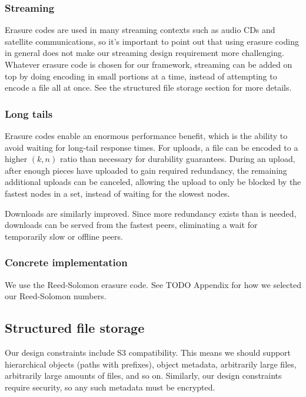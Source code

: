 \documentclass[a4paper,10pt]{article}
\newcommand{\todo}[1]{{\color{red} TODO #1}}
\begin{document}
\subsubsection{Streaming}

Erasure codes are used in many streaming contexts such as audio CDs and
satellite communications, so it's important to point out that using
erasure coding in general does not make our streaming design requirement
more challenging. Whatever erasure code is chosen for our framework, streaming
can be added on top by doing encoding in small portions at a time, instead of
attempting to encode a file all at once. See the structured file storage
section for more details.

\subsubsection{Long tails}

Erasure codes enable an enormous performance benefit, which is the ability
to avoid waiting for long-tail response times.\cite{tail-at-scale} For uploads,
a file can be encoded to a higher $(k, n)$ ratio than necessary for durability
guarantees. During an upload, after enough pieces have uploaded to gain
required redundancy, the remaining additional uploads can be canceled, allowing
the upload to only be blocked by the fastest nodes in a set, instead of waiting
for the slowest nodes.

Downloads are similarly improved. Since more redundancy exists than is needed,
downloads can be served from the fastest peers, eliminating a wait for
temporarily slow or offline peers.

\subsubsection{Concrete implementation}

We use the Reed-Solomon erasure code. See \todo{Appendix} for how we selected
our Reed-Solomon numbers.

\subsection{Structured file storage}

Our design constraints include S3 compatibility. This means we should support
hierarchical objects (paths with prefixes), object metadata, arbitrarily large
files, arbitrarily large amounts of files, and so on. Similarly, our design
constraints require security, so any such metadata must be encrypted.
\end{document}
